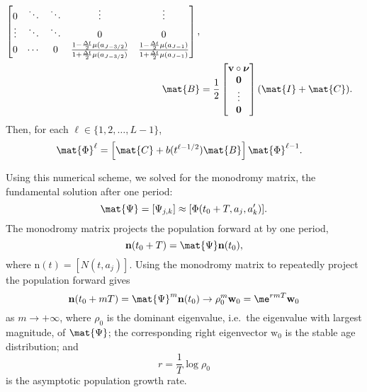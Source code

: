 \documentclass{jpmarticle}
\renewcommand{\vec}[1]{\boldsymbol{\mathrm{#1}}}
\begin{document}
\begin{equation}
\begin{split}
\begin{bmatrix}
      0 & \ddots & \ddots & \vdots & \vdots
      \\
      \vdots & \ddots & \ddots & 0 & 0
      \\
      0 & \cdots & 0 &
      \frac{1 - \frac{\Delta t}{2} \mu(a_{J - 3 / 2})}
      {1 + \frac{\Delta t}{2} \mu(a_{J - 3 / 2})}
      & \frac{1 - \frac{\Delta t}{2} \mu(a_{J - 1})}
      {1 + \frac{\Delta t}{2} \mu(a_{J - 1})}
    \end{bmatrix},
    \\
    \mat{B} &=
    \frac{1}{2}
    \begin{bmatrix}
      \vec{v} \circ \vec{\nu} \\ \vec{0} \\ \vdots \\ \vec{0}
    \end{bmatrix}
    (\mat{I} + \mat{C}).
  \end{split}
\end{equation}
Then, for each $\ell \in \{1, 2, \ldots, L - 1\}$,
\begin{equation}
  \begin{split}
    \mat{\Phi}^{\ell}
    &=
    \left[
      \mat{C}
      + b(t^{\ell - 1 / 2}) \mat{B}
    \right]
    \mat{\Phi}^{\ell - 1}.
  \end{split}
\end{equation}

Using this numerical scheme, we solved for the monodromy matrix, the
fundamental solution after one period:
\begin{equation}
  \mat{\Psi} = [\Psi_{j, k}] \approx [\Phi(t_0 + T, a_j, a'_k)].
\end{equation}
The monodromy matrix projects the population forward at by one period,
\begin{equation}
  \vec{n}(t_0 + T) = \mat{\Psi} \vec{n}(t_0),
\end{equation}
where $\vec{n}(t) = [N(t, a_j)]$.
Using the monodromy matrix to repeatedly project the population
forward gives
\begin{equation}
  \vec{n}(t_0 + m T)
  = \mat{\Psi}^m \vec{n}(t_0)
  \to \rho_0^m \vec{w}_0
  = \me^{r m T} \vec{w}_0
\end{equation}
as $m \to +\infty$, where $\rho_0$ is the dominant eigenvalue,
i.e.~the eigenvalue with largest magnitude, of $\mat{\Psi}$;
the corresponding right eigenvector $\vec{w}_0$ is the stable age
distribution; and
\begin{equation}
  r = \frac{1}{T} \log \rho_0
\end{equation}
is the asymptotic population growth rate.
\end{document}
